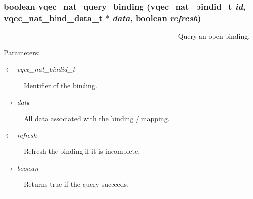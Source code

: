 \subsubsection{\setlength{\rightskip}{0pt plus 5cm}boolean vqec\_\-nat\_\-query\_\-binding (vqec\_\-nat\_\-bindid\_\-t {\em id}, vqec\_\-nat\_\-bind\_\-data\_\-t $\ast$ {\em data}, boolean {\em refresh})}\label{vqec__nat__interface_8h_11f5bd7a7ac577f32a1e90a2da0c78a2}


--------------------------------------------------------------------------- Query an open binding.

\begin{Desc}
\item[Parameters:]
\begin{description}
\item[\mbox{$\leftarrow$} {\em vqec\_\-nat\_\-bindid\_\-t}]Identifier of the binding. \item[\mbox{$\rightarrow$} {\em data}]All data associated with the binding / mapping. \item[\mbox{$\leftarrow$} {\em refresh}]Refresh the binding if it is incomplete. \item[\mbox{$\rightarrow$} {\em boolean}]Returns true if the query succeeds. --------------------------------------------------------------------------- \end{description}
\end{Desc}
